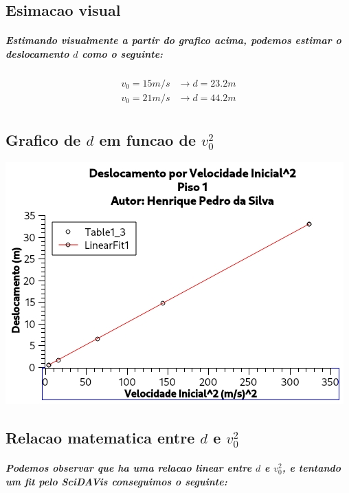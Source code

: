 \documentclass[12pt,twoside, a4paper, twocolumn]{article}
\begin{document}
\subsection{Esimacao visual}

\subparagraph*{Estimando visualmente a partir do grafico acima, podemos estimar o deslocamento $d$ como o seguinte:}

\begin{equation}
    \begin{aligned}
        v_0 = 15 m/s & \rightarrow d = 23.2 m \\
        v_0 = 21 m/s & \rightarrow d = 44.2 m \\
    \end{aligned}
\end{equation}

\subsection{Grafico de $d$ em funcao de $v_0^2$}



\begin{adjustbox}{scale=0.75}
    \includegraphics{Grafico-1.jpg}
\end{adjustbox}

\subsection{Relacao matematica entre $d$ e $v_0^2$}

\subparagraph*{Podemos observar que ha uma relacao linear entre $d$ e $v_0^2$, e tentando um \emph{fit} pelo SciDAVis conseguimos o seguinte: }
\end{document}

